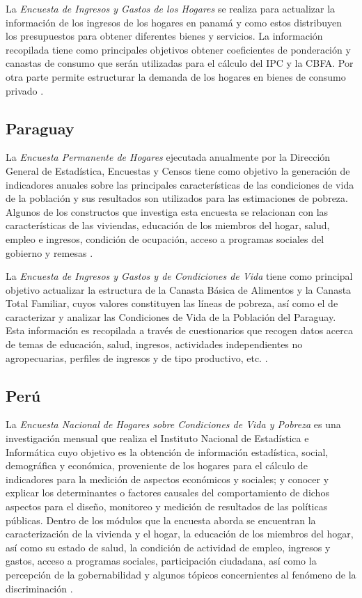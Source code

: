 \documentclass[
  12pt,
]{book}
\begin{document}
La \emph{Encuesta de Ingresos y Gastos de los Hogares} se realiza para actualizar la información de los ingresos de los hogares en panamá y como estos distribuyen los presupuestos para obtener diferentes bienes y servicios. La información recopilada tiene como principales objetivos obtener coeficientes de ponderación y canastas de consumo que serán utilizadas para el cálculo del IPC y la CBFA. Por otra parte permite estructurar la demanda de los hogares en bienes de consumo privado \citep{INEC2-PA}.

\hypertarget{paraguay}{%
\subsection{Paraguay}\label{paraguay}}

La \emph{Encuesta Permanente de Hogares} ejecutada anualmente por la Dirección General de Estadística, Encuestas y Censos tiene como objetivo la generación de indicadores anuales sobre las principales características de las condiciones de vida de la población y sus resultados son utilizados para las estimaciones de pobreza. Algunos de los constructos que investiga esta encuesta se relacionan con las características de las viviendas, educación de los miembros del hogar, salud, empleo e ingresos, condición de ocupación, acceso a programas sociales del gobierno y remesas \citep{DGEEC-PY}.

La \emph{Encuesta de Ingresos y Gastos y de Condiciones de Vida} tiene como principal objetivo actualizar la estructura de la Canasta Básica de Alimentos y la Canasta Total Familiar, cuyos valores constituyen las líneas de pobreza, así como el de caracterizar y analizar las Condiciones de Vida de la Población del Paraguay. Esta información es recopilada a través de cuestionarios que recogen datos acerca de temas de educación, salud, ingresos, actividades independientes no agropecuarias, perfiles de ingresos y de tipo productivo, etc. \citep{DGEEC2-PY}.

\hypertarget{peruxfa}{%
\subsection{Perú}\label{peruxfa}}

La \emph{Encuesta Nacional de Hogares sobre Condiciones de Vida y Pobreza} es una investigación mensual que realiza el Instituto Nacional de Estadística e Informática cuyo objetivo es la obtención de información estadística, social, demográfica y económica, proveniente de los hogares para el cálculo de indicadores para la medición de aspectos económicos y sociales; y conocer y explicar los determinantes o factores causales del comportamiento de dichos aspectos para el diseño, monitoreo y medición de resultados de las políticas públicas. Dentro de los módulos que la encuesta aborda se encuentran la caracterización de la vivienda y el hogar, la educación de los miembros del hogar, así como su estado de salud, la condición de actividad de empleo, ingresos y gastos, acceso a programas sociales, participación ciudadana, así como la percepción de la gobernabilidad y algunos tópicos concernientes al fenómeno de la discriminación \citep{INEI-PE_2016}.
\end{document}

